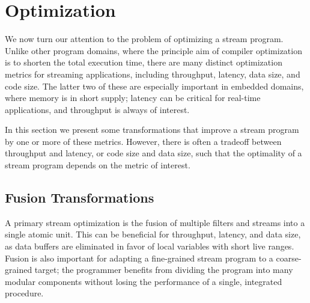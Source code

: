 \section{Optimization}

We now turn our attention to the problem of optimizing a stream program.
Unlike other program domains, where the principle aim of compiler
optimization is to shorten the total execution time, there are many
distinct optimization metrics for streaming applications, including
throughput, latency, data size, and code size.  The latter two of these
are especially important in embedded domains, where memory is in short
supply; latency can be critical for real-time applications, and
throughput is always of interest.

%

In this section we present some transformations that improve a stream
program by one or more of these metrics.  However, there is often a
tradeoff between throughput and latency, or code size and data size,
such that the optimality of a stream program depends on the metric of
interest.

\subsection{Fusion Transformations}

A primary stream optimization is the fusion of multiple filters and
streams into a single atomic unit.  This can be beneficial for
throughput, latency, and data size, as data buffers are eliminated in
favor of local variables with short live ranges.  Fusion is also
important for adapting a fine-grained stream program to a
coarse-grained target; the programmer benefits from dividing the
program into many modular components without losing the performance of
a single, integrated procedure.

